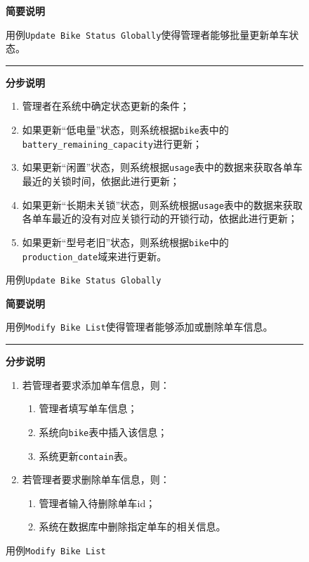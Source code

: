 \begin{figure}
    \centering
 \begin{mdframed}[leftmargin=0pt, rightmargin=0pt]
    \textbf{简要说明}

    用例\texttt{Update Bike Status Globally}使得管理者能够批量更新单车状态。

\noindent\rule{\textwidth}{0.5pt} %
    \textbf{分步说明}

    \begin{enumerate}
        \item 管理者在系统中确定状态更新的条件；
        \item 如果更新“低电量”状态，则系统根据\texttt{bike}表中的\texttt{battery\_remaining\_capacity}进行更新；
        \item 如果更新“闲置”状态，则系统根据\texttt{usage}表中的数据来获取各单车最近的关锁时间，依据此进行更新；
        \item 如果更新“长期未关锁”状态，则系统根据\texttt{usage}表中的数据来获取各单车最近的没有对应关锁行动的开锁行动，依据此进行更新；
        \item 如果更新“型号老旧”状态，则系统根据\texttt{bike}中的\texttt{production\_date}域来进行更新。
    \end{enumerate}
\end{mdframed}   
\caption{用例\texttt{Update Bike Status Globally}}\label{UpdateBikeStatusGlobally}
\end{figure}

\begin{figure}
    \centering
 \begin{mdframed}[leftmargin=0pt, rightmargin=0pt]
    \textbf{简要说明}

    用例\texttt{Modify Bike List}使得管理者能够添加或删除单车信息。

\noindent\rule{\textwidth}{0.5pt} %
    \textbf{分步说明}

    \begin{enumerate}
        \item 若管理者要求添加单车信息，则：
        \begin{enumerate}
            \item 管理者填写单车信息；
            \item 系统向\texttt{bike}表中插入该信息；
            \item 系统更新\texttt{contain}表。
        \end{enumerate}
        \item 若管理者要求删除单车信息，则：
        \begin{enumerate}
            \item 管理者输入待删除单车id；
            \item 系统在数据库中删除指定单车的相关信息。
        \end{enumerate}
    \end{enumerate}
\end{mdframed}   
\caption{用例\texttt{Modify Bike List}}\label{ModifyBikeList}
\end{figure}

